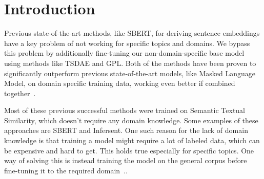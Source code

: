\documentclass[fleqn,moreauthors,10pt]{ds_report}
\affiliation{\textit{Advisors: Slavko Žitnik, Aleš Žagar, Boshko Koloski}}
\begin{document}
\flushbottom 

\maketitle 

\thispagestyle{empty} 


\section*{Introduction}

Previous state-of-the-art methods, like SBERT, for deriving sentence embeddings have a key problem of not working for specific topics and domains. We bypass this problem by additionally fine-tuning our non-domain-specific base model using methods like TSDAE and GPL. Both of the methods have been proven to significantly outperform previous state-of-the-art models, like Masked Language Model, on domain specific training data, working even better if combined together~\cite{wang-etal-2021-tsdae-using, GPL}. 

Most of these previous successful methods were trained on Semantic Textual Similarity, which doesn't require any domain knowledge. Some examples of these approaches are SBERT and Infersent. One such reason for the lack of domain knowledge is that training a model might require a lot of labeled data, which can be expensive and hard to get. This holds true especially for specific topics. One way of solving this is instead training the model on the general corpus before fine-tuning it to the required domain~\cite{wang-etal-2021-tsdae-using, GPL}..
\end{document}
